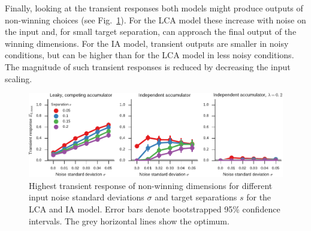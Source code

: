 \documentclass[10pt,letterpaper]{article}
\begin{document}
Finally, looking at the transient responses both models might produce outputs of non-winning choices (see Fig.~\ref{fig:transient}).
For the LCA model these increase with noise on the input and, for small target separation, can approach the final output of the winning dimensions.
For the IA model, transient outputs are smaller in noisy conditions, but can be higher than for the LCA model in less noisy conditions.
The magnitude of such transient responses is reduced by decreasing the input scaling.
\begin{figure}
    \centering
    \includegraphics{figures/transient}
    \caption{Highest transient response of non-winning dimensions for different 
        input noise standard deviations $\sigma$ and target separations $s$ for 
        the LCA and IA model. Error bars denote bootstrapped 95\% confidence 
        intervals. The grey horizontal lines show the 
        optimum.}\label{fig:transient}
\end{figure}
\end{document}
